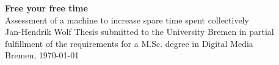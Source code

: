 \documentclass[12pt,numbers=noenddot,parskip,bibliography=totocnumbered,listof=totocnumbered,draft]{scrreprt}
\begin{document}
	
\begin{titlepage}
\null
\vfill


\Huge\textbf{Free your free time}
\bigskip\\
\LARGE{ Assessment of a machine to increase spare time spent collectively}
\medskip\\
\Large{Jan-Hendrik Wolf}
\vfill
\vfill
\vfill
\small{Thesis submitted to the University Bremen in partial fulfillment of the requirements for a M.Sc. degree in Digital Media\\
Bremen, \today}
\end{titlepage}


\tableofcontents
\end{document}
